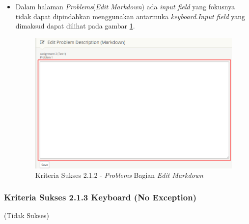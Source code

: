 \documentclass[a4paper,twoside]{article}
\begin{document}
\begin{enumerate}
\begin{itemize}
			\item Dalam halaman \textit{Problems}(\textit{Edit Markdown}) ada \textit{input field} yang fokusnya tidak dapat dipindahkan menggunakan antarmuka \textit{keyboard}.\textit{Input field} yang dimaksud dapat dilihat pada gambar \ref{fig:kepatuhan_2_1_2_problems_edit_markdown}.
			\begin{figure}[H]
				\centering  
				\includegraphics[scale=0.5]{kepatuhan_2_1_2_problems_edit_markdown}  
				\caption[Kriteria Sukses 2.1.2 - \textit{Problems} Bagian \textit{Edit Markdown}]{Kriteria Sukses 2.1.2 - \textit{Problems} Bagian \textit{Edit Markdown}} 
				\label{fig:kepatuhan_2_1_2_problems_edit_markdown} 
			\end{figure}
			
		\end{itemize}
		
		\subsubsection*{Kriteria Sukses 2.1.3 Keyboard (No Exception)}
		\label{subsubsec:kepatuhan_kriteria_2.1.3}
		(Tidak Sukses) \\
		

\end{enumerate}
\end{document}
